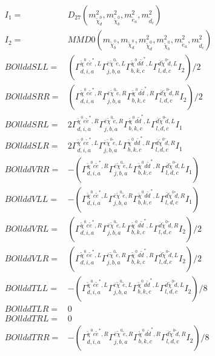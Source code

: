 \documentclass[A4,landscape]{article}
\begin{document}
\begin{align} 
I_1 = & D_{27}(m^2_{\tilde{\chi}^0_{{d}}}, m^2_{\tilde{\chi}^0_{{b}}}, m^2_{\tilde{e}_{{a}}}, m^2_{\tilde{d}_{{c}}}) \\ 
I_2 = & MMD0(m_{\tilde{\chi}^0_{{b}}}, m_{\tilde{\chi}^0_{{d}}}, m^2_{\tilde{\chi}^0_{{d}}}, m^2_{\tilde{\chi}^0_{{b}}}, m^2_{\tilde{e}_{{a}}}, m^2_{\tilde{d}_{{c}}}) \\ 
  BOllddSLL= & ( \Gamma^{\tilde{\chi}^0 e \tilde{e}^*,L}_{d, i, a} \Gamma^{\bar{e}\tilde{\chi}^0 \tilde{e} ,L}_{j, b, a} \Gamma^{\tilde{\chi}^0 d \tilde{d}^*,L}_{b, k, c} \Gamma^{\bar{d}\tilde{\chi}^0 \tilde{d} ,L}_{l, d, c} I_2)/2 \\ 
  BOllddSRR= & ( \Gamma^{\tilde{\chi}^0 e \tilde{e}^*,R}_{d, i, a} \Gamma^{\bar{e}\tilde{\chi}^0 \tilde{e} ,R}_{j, b, a} \Gamma^{\tilde{\chi}^0 d \tilde{d}^*,R}_{b, k, c} \Gamma^{\bar{d}\tilde{\chi}^0 \tilde{d} ,R}_{l, d, c} I_2)/2 \\ 
  BOllddSRL= & 2  \Gamma^{\tilde{\chi}^0 e \tilde{e}^*,R}_{d, i, a} \Gamma^{\bar{e}\tilde{\chi}^0 \tilde{e} ,R}_{j, b, a} \Gamma^{\tilde{\chi}^0 d \tilde{d}^*,L}_{b, k, c} \Gamma^{\bar{d}\tilde{\chi}^0 \tilde{d} ,L}_{l, d, c} I_1 \\ 
  BOllddSLR= & 2  \Gamma^{\tilde{\chi}^0 e \tilde{e}^*,L}_{d, i, a} \Gamma^{\bar{e}\tilde{\chi}^0 \tilde{e} ,L}_{j, b, a} \Gamma^{\tilde{\chi}^0 d \tilde{d}^*,R}_{b, k, c} \Gamma^{\bar{d}\tilde{\chi}^0 \tilde{d} ,R}_{l, d, c} I_1 \\ 
  BOllddVRR= & -( \Gamma^{\tilde{\chi}^0 e \tilde{e}^*,R}_{d, i, a} \Gamma^{\bar{e}\tilde{\chi}^0 \tilde{e} ,L}_{j, b, a} \Gamma^{\tilde{\chi}^0 d \tilde{d}^*,R}_{b, k, c} \Gamma^{\bar{d}\tilde{\chi}^0 \tilde{d} ,L}_{l, d, c} I_1) \\ 
  BOllddVLL= & -( \Gamma^{\tilde{\chi}^0 e \tilde{e}^*,L}_{d, i, a} \Gamma^{\bar{e}\tilde{\chi}^0 \tilde{e} ,R}_{j, b, a} \Gamma^{\tilde{\chi}^0 d \tilde{d}^*,L}_{b, k, c} \Gamma^{\bar{d}\tilde{\chi}^0 \tilde{d} ,R}_{l, d, c} I_1) \\ 
  BOllddVRL= & ( \Gamma^{\tilde{\chi}^0 e \tilde{e}^*,R}_{d, i, a} \Gamma^{\bar{e}\tilde{\chi}^0 \tilde{e} ,L}_{j, b, a} \Gamma^{\tilde{\chi}^0 d \tilde{d}^*,L}_{b, k, c} \Gamma^{\bar{d}\tilde{\chi}^0 \tilde{d} ,R}_{l, d, c} I_2)/2 \\ 
  BOllddVLR= & ( \Gamma^{\tilde{\chi}^0 e \tilde{e}^*,L}_{d, i, a} \Gamma^{\bar{e}\tilde{\chi}^0 \tilde{e} ,R}_{j, b, a} \Gamma^{\tilde{\chi}^0 d \tilde{d}^*,R}_{b, k, c} \Gamma^{\bar{d}\tilde{\chi}^0 \tilde{d} ,L}_{l, d, c} I_2)/2 \\ 
  BOllddTLL= & -( \Gamma^{\tilde{\chi}^0 e \tilde{e}^*,L}_{d, i, a} \Gamma^{\bar{e}\tilde{\chi}^0 \tilde{e} ,L}_{j, b, a} \Gamma^{\tilde{\chi}^0 d \tilde{d}^*,L}_{b, k, c} \Gamma^{\bar{d}\tilde{\chi}^0 \tilde{d} ,L}_{l, d, c} I_2)/8 \\ 
  BOllddTLR= & 0 \\ 
  BOllddTRL= & 0 \\ 
  BOllddTRR= & -( \Gamma^{\tilde{\chi}^0 e \tilde{e}^*,R}_{d, i, a} \Gamma^{\bar{e}\tilde{\chi}^0 \tilde{e} ,R}_{j, b, a} \Gamma^{\tilde{\chi}^0 d \tilde{d}^*,R}_{b, k, c} \Gamma^{\bar{d}\tilde{\chi}^0 \tilde{d} ,R}_{l, d, c} I_2)/8 \\ 
\end{align} 
\end{document}
